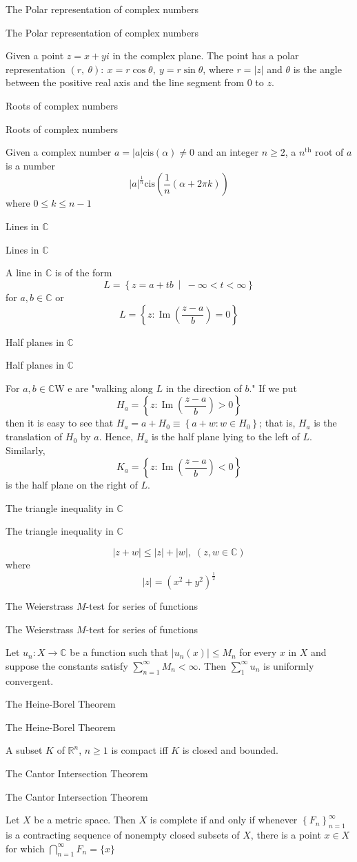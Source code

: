 \documentclass[17pt]{extarticle}
\newcommand{\R}{\mathbb{R}}
\renewcommand{\C}{\mathbb{C}}
\newcommand{\LS}{\left\lbrace}
\newcommand{\RS}{\right\rbrace}
\newcommand{\MM}{\ \middle|\ }
\newcommand{\boxset}[2]{\begin{mdframed}[style=darkQuesion]
#1
\end{mdframed}
\newpage
\begin{mdframed}[style=darkQuesion]
#1
  \end{mdframed}
\begin{mdframed}[style=darkAnswer]
#2
  \end{mdframed}
  \newpage
}
\begin{document}
\par
\newpage

\boxset{The Polar representation of complex numbers }
{Given a point $z=x+yi$ in the complex plane. The point has a polar representation $\left( r,\ \theta\right):\ x=r\cos{\theta},\ y=r\sin{\theta}$, where $r=\left|z\right|$ and $\theta$ is the angle between the positive real axis and the line segment from $0$ to $z$.}%
\boxset{Roots of complex numbers }
{Given a complex number $a=\left|a\right|\text{cis}\left(\alpha\right)\neq 0$ and an integer $n\geq 2$, a $n^{\text{th}}$ root of $a$ is a number \[\left|a\right|^{\frac{1}{n}}\text{cis}\left( \frac{1}{n}\left( \alpha+2\pi k\right)\right)\] where $0\leq k \leq n-1$ }%
\boxset{Lines in $\C$ }
{A line in $\C$ is of the form \[L=\LS z=a+tb\MM -\infty<t<\infty\RS \] for $a,b\in\C$ or \[L=\left\{z: \operatorname{Im}\left(\frac{z-a}{b}\right)=0\right\}\] }%
\boxset{Half planes in $\C$ }
{For $a,b\in\C$W e are "walking along $L$ in the direction of $b$." If we put \[H_{a}=\left\{z: \operatorname{Im}\left(\frac{z-a}{b}\right)>0\right\}\] then it is easy to see that $H_{a}=a+H_{0} \equiv\left\{a+w: w \in H_{0}\right\}$; that is, $H_{a}$ is the translation of $H_{0}$ by $a$. Hence, $H_{a}$ is the half plane lying to the left of $L$. Similarly, \[K_{a}=\left\{z: \operatorname{Im}\left(\frac{z-a}{b}\right)<0\right\}\] is the half plane on the right of $L$.}%
\boxset{The triangle inequality in $\C$ }
{\[|z+w| \leq|z|+|w|,\;(z, w \in \C)\] where \[|z|=\left(x^{2}+y^{2}\right)^{\frac{1}{2}}\] }%
\boxset{The Weierstrass $M$-test for series of functions }
{ Let $u_{n}: X \rightarrow \C$ be a function such that $\left|u_{n}(x)\right| \leq M_{n}$ for every $x$ in $X$ and suppose the constants satisfy $\sum_{n=1}^{\infty} M_{n}<\infty$. Then $\sum_{1}^{\infty} u_{n}$ is uniformly convergent. }%
\boxset{The Heine-Borel Theorem }
{A subset $K$ of $\R^n$, $n\geq 1$ is compact iff $K$ is closed and bounded.}%
\boxset{The Cantor Intersection Theorem }
{Let $X$ be a metric space. Then $X$ is complete if and only if whenever $\left\{F_{n}\right\}_{n=1}^{\infty}$ is a contracting sequence of nonempty closed subsets of $X$, there is a point $x \in X$ for which $\bigcap_{n=1}^{\infty} F_{n}=\{x\}$}%
\end{document}
